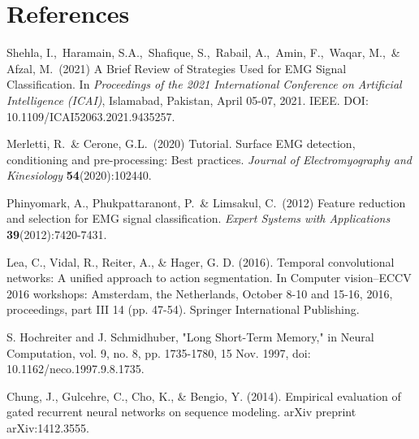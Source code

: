 
\section*{References}




{
\small
\begin{enumerate}[label={[}\arabic*{]}]
    \item Shehla, I.,\  Haramain, S.A.,\ Shafique, S.,\  Rabail, A.,\  Amin, F.,\  Waqar, M.,\  \& Afzal, M.\ (2021) 
    A Brief Review of Strategies Used for EMG Signal Classification.  
    In \textit{Proceedings of the 2021 International Conference on Artificial Intelligence (ICAI)},  
    Islamabad, Pakistan, April 05-07, 2021. IEEE.  
    DOI: 10.1109/ICAI52063.2021.9435257.  


    \item Merletti, R.\ \& Cerone, G.L.\
    (2020) Tutorial. Surface EMG detection, conditioning and pre-processing: Best 
    practices.
    {\it Journal of Electromyography and Kinesiology} {\bf 54}(2020):102440.


    \item Phinyomark, A., Phukpattaranont, P.\ \& Limsakul, C.\
    (2012) Feature reduction and selection for EMG signal classification.
    {\it Expert Systems with Applications} {\bf 39}(2012):7420-7431.
    
    \item Lea, C., Vidal, R., Reiter, A., \& Hager, G. D. (2016). Temporal convolutional networks: A unified approach to action segmentation. In Computer vision–ECCV 2016 workshops: Amsterdam, the Netherlands, October 8-10 and 15-16, 2016, proceedings, part III 14 (pp. 47-54). Springer International Publishing.

    \item S. Hochreiter and J. Schmidhuber, "Long Short-Term Memory," in Neural Computation, vol. 9, no. 8, pp. 1735-1780, 15 Nov. 1997, doi: 10.1162/neco.1997.9.8.1735.

    \item Chung, J., Gulcehre, C., Cho, K., \& Bengio, Y. (2014). Empirical evaluation of gated recurrent neural networks on sequence modeling. arXiv preprint arXiv:1412.3555.
\end{enumerate}
}


